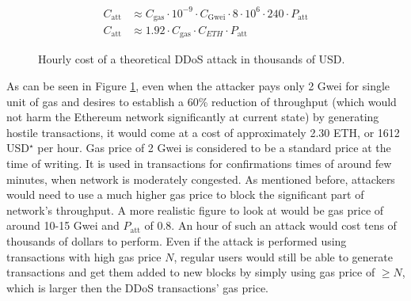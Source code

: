 \begin{align} \label{eq_1}
C_{\mathrm{att}} &\approx C_{\mathrm{gas}}  \cdot 10^{-9} \cdot C_{\mathrm{Gwei}} \cdot 8 \cdot 10^{6} \cdot 240 \cdot P_{\mathrm{att}}\\
C_{\mathrm{att}} &\approx 1.92 \cdot C_{\mathrm{gas}}  \cdot  C_{ETH} \cdot P_{\mathrm{att}}
\end{align}

\begin{figure}[H]
\centering
{}
\caption{Hourly cost of a theoretical DDoS attack in thousands of USD.}
\label{fig:ethddos}
\end{figure}

As can be seen in Figure \ref{fig:ethddos}, even when the attacker pays only 2 Gwei for single unit of gas and desires to establish a 60\% reduction of throughput (which would not harm the Ethereum network significantly at current state) by generating hostile transactions, it would come at a cost of approximately 2.30 ETH, or 1612 USD$^\star$ per hour. Gas price of 2 Gwei is considered to be a standard price at the time of writing. It is used in transactions for confirmations times of around few minutes, when network is moderately congested. As mentioned before, attackers would need to use a much higher gas price to block the significant part of network's throughput. A more realistic figure to look at would be gas price of around 10-15 Gwei and $P_{\mathrm{att}}$ of 0.8. An hour of such an attack would cost tens of thousands of dollars to perform. Even if the attack is performed using transactions with high gas price $N$, regular users would still be able to generate transactions and get them added to new blocks by simply using gas price of $\geq N$, which is larger then the DDoS transactions' gas price.

